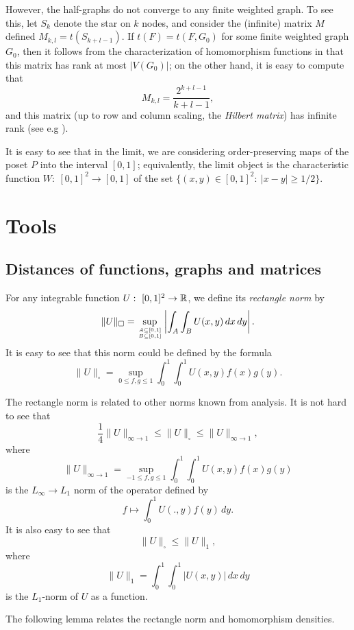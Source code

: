 \documentclass[fleqn]{article}
\begin{document}
However, the half-graphs do not converge to any finite weighted
graph. To see this, let $S_k$ denote the star on $k$ nodes, and
consider the (infinite) matrix $M$ defined $M_{k,l}=t(S_{k+l-1})$. If
$t(F)=t(F,G_0)$ for some finite weighted graph $G_0$, then it follows
from the characterization of homomorphism functions in \cite{FLS}
that this matrix has rank at most $|V(G_0)|$; on the other hand, it
is easy to compute that
\[
M_{k,l}=\frac{2^{k+l-1}}{k+l-1},
\]
and this matrix (up to row and column scaling, the {\it Hilbert
matrix}) has infinite rank (see e.g \cite{Cho}).

It is easy to see that in the limit, we are considering
order-preserving maps of the poset $P$ into the interval $[0,1]$;
equivalently, the limit object is the characteristic function
$W:~[0,1]^2\to[0,1]$ of the set $\{(x,y)\in[0,1]^2:~ |x-y|\ge 1/2\}$.

\section{Tools}

\subsection{Distances of functions, graphs and matrices}

For any integrable function $U:~[0,1]^2\to {\mathbb R}$, we define its {\it
rectangle norm} by
\begin{equation}\label{SQUAREDEF}
\|U\|_\square=\sup_{\ontop{A\subseteq [0,1]}{B\subseteq
[0,1]}}\left|\int_A\int_B U(x,y)\,dx\,dy\right|.
\end{equation}
It is easy to see that this norm could be defined by the formula
\begin{equation}\label{SQUAREALT}
\|U\|_\square= \sup_{0\le f,g \le 1} \int_0^1\int_0^1 U(x,y)f(x)g(y).
\end{equation}

The rectangle norm is related to other norms known from analysis. It
is not hard to see that
\[
\frac{1}{4} \|U\|_{\infty\to1} \le \|U\|_\square \le
\|U\|_{\infty\to1},
\]
where
\[
\|U\|_{\infty\to1} = \sup_{-1\le f,g\le 1} \int_0^1\int_0^1
U(x,y)f(x)g(y)
\]
is the $L_\infty\to L_1$ norm of the operator defined by
\[
f\mapsto \int_0^1 U(.,y)f(y)\,dy.
\]
It is also easy to see that
\[
\|U\|_\square\le \|U\|_1,
\]
where
\[
\|U\|_1=\int_0^1\int_0^1 |U(x,y)|\,dx\,dy
\]
is the $L_1$-norm of $U$ as a function.

The following lemma relates the rectangle norm and homomorphism
densities.
\end{document}
